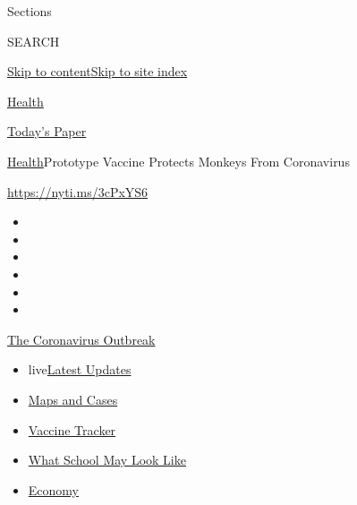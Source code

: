 Sections

SEARCH

\protect\hyperlink{site-content}{Skip to
content}\protect\hyperlink{site-index}{Skip to site index}

\href{https://www.nytimes.com/section/health}{Health}

\href{https://myaccount.nytimes.com/auth/login?response_type=cookie\&client_id=vi}{}

\href{https://www.nytimes.com/section/todayspaper}{Today's Paper}

\href{/section/health}{Health}\textbar{}Prototype Vaccine Protects
Monkeys From Coronavirus

\url{https://nyti.ms/3cPxYS6}

\begin{itemize}
\item
\item
\item
\item
\item
\item
\end{itemize}

\href{https://www.nytimes.com/news-event/coronavirus?action=click\&pgtype=Article\&state=default\&region=TOP_BANNER\&context=storylines_menu}{The
Coronavirus Outbreak}

\begin{itemize}
\tightlist
\item
  live\href{https://www.nytimes.com/2020/08/02/world/coronavirus-updates.html?action=click\&pgtype=Article\&state=default\&region=TOP_BANNER\&context=storylines_menu}{Latest
  Updates}
\item
  \href{https://www.nytimes.com/interactive/2020/us/coronavirus-us-cases.html?action=click\&pgtype=Article\&state=default\&region=TOP_BANNER\&context=storylines_menu}{Maps
  and Cases}
\item
  \href{https://www.nytimes.com/interactive/2020/science/coronavirus-vaccine-tracker.html?action=click\&pgtype=Article\&state=default\&region=TOP_BANNER\&context=storylines_menu}{Vaccine
  Tracker}
\item
  \href{https://www.nytimes.com/interactive/2020/07/29/us/schools-reopening-coronavirus.html?action=click\&pgtype=Article\&state=default\&region=TOP_BANNER\&context=storylines_menu}{What
  School May Look Like}
\item
  \href{https://www.nytimes.com/live/2020/07/31/business/stock-market-today-coronavirus?action=click\&pgtype=Article\&state=default\&region=TOP_BANNER\&context=storylines_menu}{Economy}
\end{itemize}

